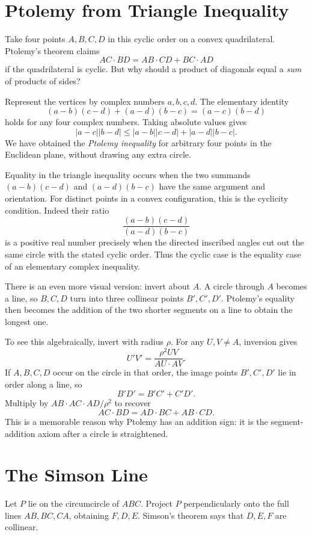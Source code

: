 \section{Ptolemy from Triangle Inequality}

Take four points \(A,B,C,D\) in this cyclic order on a convex quadrilateral. Ptolemy's theorem claims
\[
 AC\cdot BD=AB\cdot CD+BC\cdot AD
\]
if the quadrilateral is cyclic. But why should a product of diagonals equal a \emph{sum} of products of sides?

Represent the vertices by complex numbers \(a,b,c,d\). The elementary identity
\[
 (a-b)(c-d)+(a-d)(b-c)=(a-c)(b-d)
\]
holds for any four complex numbers. Taking absolute values gives
\[
 \boxed{|a-c||b-d|
 \le |a-b||c-d|+|a-d||b-c|.}
\]
We have obtained the \emph{Ptolemy inequality} for arbitrary four points in the Euclidean plane, without drawing any extra circle.

Equality in the triangle inequality occurs when the two summands
\((a-b)(c-d)\) and \((a-d)(b-c)\) have the same argument and orientation. For distinct points in a convex configuration, this is the cyclicity condition. Indeed their ratio
\[
 \frac{(a-b)(c-d)}{(a-d)(b-c)}
\]
is a positive real number precisely when the directed inscribed angles cut out the same circle with the stated cyclic order. Thus the cyclic case is the equality case of an elementary complex inequality.

There is an even more visual version: invert about \(A\). A circle through \(A\) becomes a line, so \(B,C,D\) turn into three collinear points \(B',C',D'\). Ptolemy's equality then becomes the addition of the two shorter segments on a line to obtain the longest one.

To see this algebraically, invert with radius \(\rho\). For any \(U,V\ne A\), inversion gives
\[
 U'V'=\frac{\rho^2 UV}{AU\cdot AV}.
\]
If \(A,B,C,D\) occur on the circle in that order, the image points \(B',C',D'\) lie in order along a line, so
\[
 B'D'=B'C'+C'D'.
\]
Multiply by \(AB\cdot AC\cdot AD/\rho^2\) to recover
\[
 AC\cdot BD=AD\cdot BC+AB\cdot CD.
\]
This is a memorable reason why Ptolemy has an addition sign: it is the segment-addition axiom after a circle is straightened.

\section{The Simson Line}

Let \(P\) lie on the circumcircle of \(ABC\). Project \(P\) perpendicularly onto the full lines \(AB,BC,CA\), obtaining \(F,D,E\). Simson's theorem says that \(D,E,F\) are collinear.

